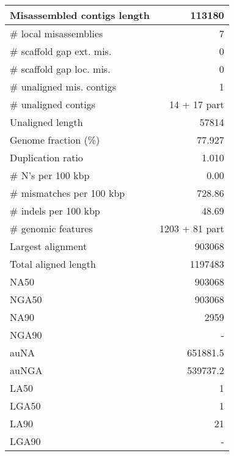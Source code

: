 \documentclass[12pt,a4paper]{article}
\begin{document}
\begin{table}[ht]
\begin{center}
\begin{tabular}{|l*{1}{|r}|}
Misassembled contigs length & 113180 \\ \hline
\# local misassemblies & 7 \\ \hline
\# scaffold gap ext. mis. & 0 \\ \hline
\# scaffold gap loc. mis. & 0 \\ \hline
\# unaligned mis. contigs & 1 \\ \hline
\# unaligned contigs & 14 + 17 part \\ \hline
Unaligned length & 57814 \\ \hline
Genome fraction (\%) & 77.927 \\ \hline
Duplication ratio & 1.010 \\ \hline
\# N's per 100 kbp & 0.00 \\ \hline
\# mismatches per 100 kbp & 728.86 \\ \hline
\# indels per 100 kbp & 48.69 \\ \hline
\# genomic features & 1203 + 81 part \\ \hline
Largest alignment & 903068 \\ \hline
Total aligned length & 1197483 \\ \hline
NA50 & 903068 \\ \hline
NGA50 & 903068 \\ \hline
NA90 & 2959 \\ \hline
NGA90 & - \\ \hline
auNA & 651881.5 \\ \hline
auNGA & 539737.2 \\ \hline
LA50 & 1 \\ \hline
LGA50 & 1 \\ \hline
LA90 & 21 \\ \hline
LGA90 & - \\ \hline
\end{tabular}
\end{center}
\end{table}
\end{document}
